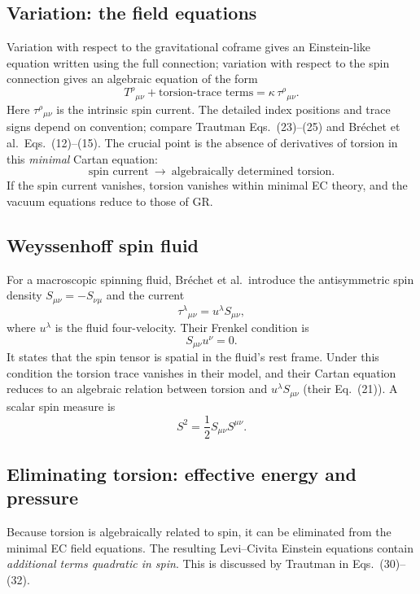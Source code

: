 \documentclass[11pt,a4paper]{article}
\begin{document}
\subsection{Variation: the field equations}
Variation with respect to the gravitational coframe gives an Einstein-like equation written using the full connection; variation with respect to the spin connection gives an algebraic equation of the form
\begin{equation}
\boxed{T^\rho{}_{\mu\nu}+\text{torsion-trace terms}
=\kappa\,\tau^\rho{}_{\mu\nu}.}
\end{equation}
Here $\tau^\rho{}_{\mu\nu}$ is the intrinsic spin current. The detailed index positions and trace signs depend on convention; compare Trautman Eqs.~(23)--(25) and Br\'echet et al.\ Eqs.~(12)--(15). The crucial point is the absence of derivatives of torsion in this \emph{minimal} Cartan equation:
\begin{equation}
\boxed{\text{spin current}\ \longrightarrow\ \text{algebraically determined torsion}.}
\end{equation}
If the spin current vanishes, torsion vanishes within minimal EC theory, and the vacuum equations reduce to those of GR.

\subsection{Weyssenhoff spin fluid}
For a macroscopic spinning fluid, Br\'echet et al.\ introduce the antisymmetric spin density $S_{\mu\nu}=-S_{\nu\mu}$ and the current
\begin{equation}
\tau^\lambda{}_{\mu\nu}=u^\lambda S_{\mu\nu},
\end{equation}
where $u^\lambda$ is the fluid four-velocity. Their Frenkel condition is
\begin{equation}
\boxed{S_{\mu\nu}u^\nu=0}.
\end{equation}
It states that the spin tensor is spatial in the fluid's rest frame. Under this condition the torsion trace vanishes in their model, and their Cartan equation reduces to an algebraic relation between torsion and $u^\lambda S_{\mu\nu}$ (their Eq.~(21)). A scalar spin measure is
\begin{equation}
\boxed{S^2=\frac12 S_{\mu\nu}S^{\mu\nu}}.
\end{equation}
\subsection{Eliminating torsion: effective energy and pressure}
Because torsion is algebraically related to spin, it can be eliminated from the minimal EC field equations. The resulting Levi--Civita Einstein equations contain \emph{additional terms quadratic in spin}. This is discussed by Trautman in Eqs.~(30)--(32).
\end{document}
